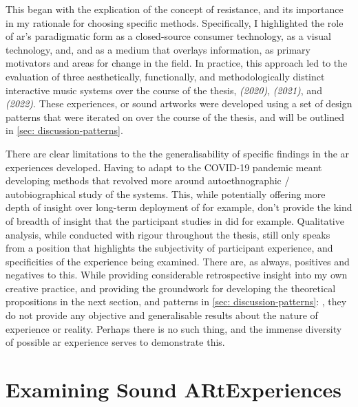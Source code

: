 \begin{enumerate}
    \RQmedium
    \RQexperience
    \RQfuture
\end{enumerate}

This began with the explication of the concept of resistance, and its importance in my rationale for choosing specific methods. Specifically, I highlighted the role of \gls{ar}'s paradigmatic form as a closed-source consumer technology, as a visual technology, and, and as a medium that overlays information, as primary motivators and areas for change in the field. In practice, this approach led to the evaluation of three aesthetically, functionally, and methodologically distinct interactive music systems over the course of the thesis, \textit{ (2020)}, \textit{ (2021)}, and \textit{ (2022)}. These experiences, or sound \gls{art}works were developed using a set of design patterns that were iterated on over the course of the thesis, and will be outlined in \autoref{sec: discussion-patterns}. 

There are clear limitations to the the generalisability of specific findings in the \gls{ar} experiences developed. Having to adapt to the COVID-19 pandemic meant developing methods that revolved more around autoethnographic / autobiographical study of the systems. This, while potentially offering more depth of insight over long-term deployment of  for example, don't provide the kind of breadth of insight that the participant studies in  did for example. Qualitative analysis, while conducted with rigour throughout the thesis, still only speaks from a position that highlights the subjectivity of participant experience, and specificities of the experience being examined. There are, as always, positives and negatives to this. While providing considerable retrospective insight into my own creative practice, and providing the groundwork for developing the theoretical propositions in the next section, and patterns in \autoref{sec: discussion-patterns}: , they do not provide any objective and generalisable results about the nature of experience or reality. Perhaps there is no such thing, and the immense diversity of possible \gls{ar} experience serves to demonstrate this.



\section{Examining Sound ARtExperiences}\label{sec: discussion-medium}
